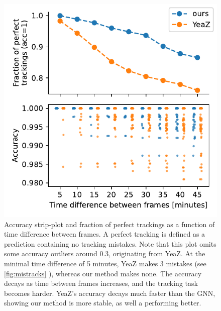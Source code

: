 \documentclass[10pt,conference,compsocconf,a4paper]{IEEEtran}
\newcommand*{\shortautoref}[1]{%
	\begingroup
	\def\equationautorefname{\textsc{Eq.}}%
	\def\tableautorefname{\textsc{Tab.}}%
	\def\figureautorefname{\textsc{Fig.}}%
	\autoref{#1}%
	\endgroup
}
\begin{document}

		\begin{figure}
			\centering
			\includegraphics[width=\linewidth]{figures/timediff_accuracy.pdf}
			\caption{Accuracy strip-plot and fraction of perfect trackings as a function of time difference between frames. A perfect tracking is defined as a prediction containing no tracking mistakes. Note that this plot omits some accuracy outliers around 0.3, originating from YeaZ. At the minimal time difference of 5 minutes, YeaZ makes 3 mistakes (see \shortautoref{fig:mistracks}), whereas our method makes none. The accuracy decays as time between frames increases, and the tracking task becomes harder. YeaZ's accuracy decays much faster than the GNN, showing our method is more stable, as well a performing better.}
			\label{fig:timediff_accuracy}
		\end{figure}
\end{document}
